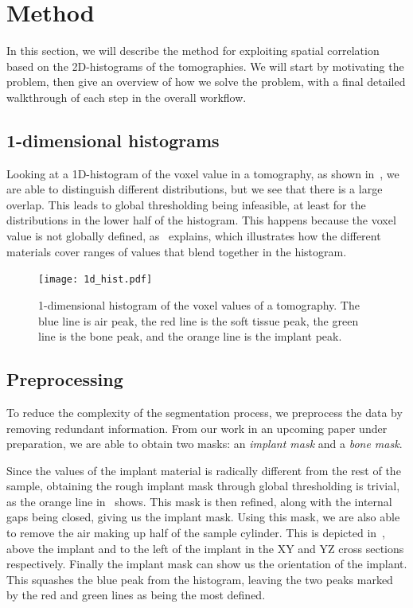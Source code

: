 \section{Method}\label{sec:method}
In this section, we will describe the method for exploiting spatial correlation based on the
2D-histograms of the tomographies. We will start by motivating the problem, then give an overview
of how we solve the problem, with a final detailed walkthrough of each step in the overall workflow.

\subsection{1-dimensional histograms}
Looking at a 1D-histogram of the voxel value in a tomography, as shown in~, we are
able to distinguish different distributions, but we see that there is a large overlap. This leads to
global thresholding being infeasible, at least for the distributions in the lower half of the histogram.
This happens because the voxel value is not globally defined, as~ explains, which
illustrates how the different materials cover ranges of values that blend together in the histogram.

\begin{figure}
    \centering
    \texttt{[image: 1d\_hist.pdf]}
    \caption{1-dimensional histogram of the voxel values of a tomography. The blue line is air peak,
    the red line is the soft tissue peak, the green line is the bone peak, and the orange line is
    the implant peak.}
    \label{fig:1d-hist}
\end{figure}

\subsection{Preprocessing}\label{sec:preprocess}
To reduce the complexity of the segmentation process, we preprocess the data by removing redundant
information. From our work in an upcoming paper under preparation, we are able to obtain two
masks: an \textit{implant mask} and a \textit{bone mask}.

Since the values of the implant material is radically different from the rest of the sample, obtaining
the rough implant mask through global thresholding is trivial, as the orange line in~
shows. This mask is then refined, along with the internal gaps being closed, giving us the implant mask.
Using this mask, we are also able to remove the air making up half of the sample cylinder. This is depicted
in~, above the implant and to the left of the implant in the XY and YZ cross
sections respectively. Finally the implant mask can show us the orientation of the implant. This squashes
the blue peak from the histogram, leaving the two peaks marked by the red and green lines as being
the most defined.

